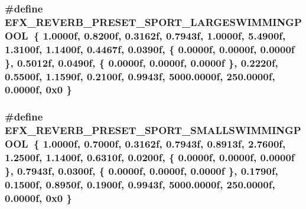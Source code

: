 \subsubsection[{\texorpdfstring{E\+F\+X\+\_\+\+R\+E\+V\+E\+R\+B\+\_\+\+P\+R\+E\+S\+E\+T\+\_\+\+S\+P\+O\+R\+T\+\_\+\+L\+A\+R\+G\+E\+S\+W\+I\+M\+M\+I\+N\+G\+P\+O\+OL}{EFX_REVERB_PRESET_SPORT_LARGESWIMMINGPOOL}}]{\setlength{\rightskip}{0pt plus 5cm}\#define E\+F\+X\+\_\+\+R\+E\+V\+E\+R\+B\+\_\+\+P\+R\+E\+S\+E\+T\+\_\+\+S\+P\+O\+R\+T\+\_\+\+L\+A\+R\+G\+E\+S\+W\+I\+M\+M\+I\+N\+G\+P\+O\+OL~\{ 1.\+0000f, 0.\+8200f, 0.\+3162f, 0.\+7943f, 1.\+0000f, 5.\+4900f, 1.\+3100f, 1.\+1400f, 0.\+4467f, 0.\+0390f, \{ 0.\+0000f, 0.\+0000f, 0.\+0000f \}, 0.\+5012f, 0.\+0490f, \{ 0.\+0000f, 0.\+0000f, 0.\+0000f \}, 0.\+2220f, 0.\+5500f, 1.\+1590f, 0.\+2100f, 0.\+9943f, 5000.\+0000f, 250.\+0000f, 0.\+0000f, 0x0 \}}\hypertarget{efx-presets_8h_ab18c0d7695c7cbcb5b240c2564c20edd}{}\label{efx-presets_8h_ab18c0d7695c7cbcb5b240c2564c20edd}
\subsubsection[{\texorpdfstring{E\+F\+X\+\_\+\+R\+E\+V\+E\+R\+B\+\_\+\+P\+R\+E\+S\+E\+T\+\_\+\+S\+P\+O\+R\+T\+\_\+\+S\+M\+A\+L\+L\+S\+W\+I\+M\+M\+I\+N\+G\+P\+O\+OL}{EFX_REVERB_PRESET_SPORT_SMALLSWIMMINGPOOL}}]{\setlength{\rightskip}{0pt plus 5cm}\#define E\+F\+X\+\_\+\+R\+E\+V\+E\+R\+B\+\_\+\+P\+R\+E\+S\+E\+T\+\_\+\+S\+P\+O\+R\+T\+\_\+\+S\+M\+A\+L\+L\+S\+W\+I\+M\+M\+I\+N\+G\+P\+O\+OL~\{ 1.\+0000f, 0.\+7000f, 0.\+3162f, 0.\+7943f, 0.\+8913f, 2.\+7600f, 1.\+2500f, 1.\+1400f, 0.\+6310f, 0.\+0200f, \{ 0.\+0000f, 0.\+0000f, 0.\+0000f \}, 0.\+7943f, 0.\+0300f, \{ 0.\+0000f, 0.\+0000f, 0.\+0000f \}, 0.\+1790f, 0.\+1500f, 0.\+8950f, 0.\+1900f, 0.\+9943f, 5000.\+0000f, 250.\+0000f, 0.\+0000f, 0x0 \}}\hypertarget{efx-presets_8h_a3868b5003b7826a394a567e55dbf6c3d}{}\label{efx-presets_8h_a3868b5003b7826a394a567e55dbf6c3d}
